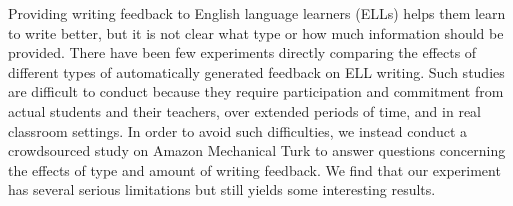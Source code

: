 Providing writing feedback to English language learners (ELLs) helps them learn to write better, but it is not clear what type or how much information should be provided. There have been few experiments directly comparing the effects of different types of automatically generated feedback on ELL writing. Such studies are difficult to conduct because they require participation and commitment from actual students and their teachers, over extended periods of time, and in real classroom settings. In order to avoid such difficulties, we instead conduct a crowdsourced study on Amazon Mechanical Turk to answer questions concerning the effects of type and amount of writing feedback. We find that our  experiment has several serious limitations but still yields some interesting results.
